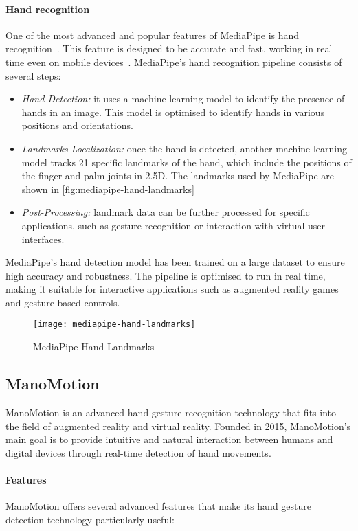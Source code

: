 \paragraph{Hand recognition}
One of the most advanced and popular features of MediaPipe is hand recognition~\cite{mediapipe-hands}.
This feature is designed to be accurate and fast,
working in real time even on mobile devices~\cite{mediapipe-lens-characteristics, mediapipe-sign-language}.
MediaPipe's hand recognition pipeline consists of several steps:
\begin{itemize}
	\item \textit{Hand Detection:} it uses a machine learning model to identify the presence of hands in an image.
	This model is optimised to identify hands in various positions and orientations.
	\item \textit{Landmarks Localization:} once the hand is detected,
	another machine learning model tracks 21 specific landmarks of the hand,
	which include the positions of the finger and palm joints in 2.5D\@.
	The landmarks used by MediaPipe are shown in \autoref{fig:mediapipe-hand-landmarks}
	\item \textit{Post-Processing:} landmark data can be further processed for specific applications,
	such as gesture recognition or interaction with virtual user interfaces.
\end{itemize}
MediaPipe's hand detection model has been trained on a large dataset to ensure high accuracy and robustness.
The pipeline is optimised to run in real time, making it suitable for interactive applications such as
augmented reality games and gesture-based controls.

\begin{figure}[ht]
	\centering
	\texttt{[image: mediapipe-hand-landmarks]}
	\caption{MediaPipe Hand Landmarks}
	\label{fig:mediapipe-hand-landmarks}
\end{figure}

\subsection{ManoMotion}\label{subsec:manomotion}
ManoMotion is an advanced hand gesture recognition technology that fits into the field of augmented reality and virtual reality.
Founded in 2015, ManoMotion's main goal is to provide intuitive and natural interaction between humans
and digital devices through real-time detection of hand movements.

\paragraph{Features}
ManoMotion offers several advanced features that make its hand gesture detection technology particularly useful:

